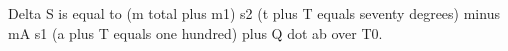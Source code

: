 Delta S is equal to (m total plus m1) s2 (t plus T equals seventy degrees) minus mA s1 (a plus T equals one hundred) plus Q dot ab over T0.